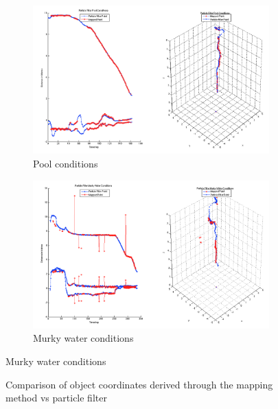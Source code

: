\documentclass[15pt]{article}
\begin{document}
\begin{figure}%
\centering
\begin{subfigure}{\columnwidth}
\centering
\includegraphics[width=0.9\columnwidth]{gg}%
\caption{Pool conditions}%
\end{subfigure}\hfill%
\begin{subfigure}{\columnwidth}
\centering
\includegraphics[width=0.9\columnwidth]{gg2}%
\caption{Murky water conditions}%
\label{subfiga}%
\end{subfigure}\hfill%
\end{figure}
\begin{figure}%
\centering
\caption{Comparison of object coordinates derived through the mapping method vs particle filter}
\label{figabc}
\end{figure}
\endgroup

\clearpage


\end{document}
